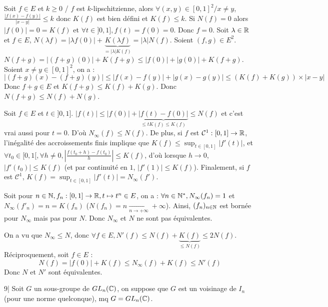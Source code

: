 \begin{solution}
Soit $f \in E$ et $k \geq 0$ / $f$ est $k$-lipschitzienne, alors $\forall (x, y) \in [0, 1]^2 / x \neq y$, $\frac{|f(x) - f(y)|}{|x - y|} \leq k$ donc $K(f)$ est bien défini et $K(f) \leq k$.
Si $N(f) = 0$ alors $|f(0)| = 0 = K(f)$ et $\forall t \in ]0, 1], f(t) = f(0) = 0$. Donc $f = 0$.
Soit $\lambda \in \mathbb R$ et $f \in E$, $N(\lambda f) = |\lambda f(0)| + \underbrace{K(\lambda f)}_{= |\lambda| K(f)} = |\lambda| N(f)$.
Soient $(f, g) \in E^2$.
$N(f + g) = |(f + g)(0)| + K(f + g) \leq |f(0)| + |g(0)| + K(f + g)$.
Soient $x \neq y \in [0, 1]^2$, on a :
\[ |(f + g)(x) - (f + g)(y)| \leq |f(x) - f(y)| + |g(x) - g(y)| \leq (K(f) + K(g)) \times |x - y| \]
Donc $f + g \in E$ et $K(f + g) \leq K(f) + K(g)$. Donc $N(f + g) \leq N(f) + N(g)$.

Soit $f \in E$ et $t \in ]0, 1]$. $|f(t)| \leq |f(0)| + \underbrace{|f(t) - f(0)|}_{\leq t K(f) \leq K(f)} \leq N(f)$ et c'est vrai aussi pour $t = 0$. D'où $N_\infty(f) \leq N(f)$.
De plus, si $f$ est $\mathcal{C}^1 : [0, 1] \to \mathbb R$, l'inégalité des accroissements finis implique que $K(f) \leq \sup_{t \in [0, 1]} |f'(t)|$, et $\forall t_0 \in [0, 1[, \forall h \neq 0, \left|\frac{f(t_0 + h) - f(t_0)}{h}\right| \leq K(f)$, d'où lorsque $h \to 0$, $|f'(t_0)| \leq K(f)$ (et par continuité en $1$, $|f'(1)| \leq K(f)$). Finalement, si $f$ est $\mathcal{C}^1$, $K(f) = \sup_{t \in [0, 1]} |f'(t)| = N_\infty(f')$.

Soit pour $n \in \mathbb N, f_n : [0, 1] \to \mathbb R, t \mapsto t^n \in E$, on a : $\forall n \in \mathbb N^*, N_\infty(f_n) = 1$ et $N_\infty(f'_n) = n = K(f_n)$ ($N(f_n) = n \xrightarrow[n \to +\infty]{} +\infty$).
Ainsi, $(f_n)_{n \in \mathbb N}$ est bornée pour $N_\infty$ mais pas pour $N$. Donc $N_\infty$ et $N$ ne sont pas équivalentes.

On a vu que $N_\infty \leq N$, donc $\forall f \in E, N'(f) \leq N(f) + \underbrace{K(f)}_{\leq N(f)} \leq 2 N(f)$.
Réciproquement, soit $f \in E$ :
\[ N(f) = |f(0)| + K(f) \leq N_\infty(f) + K(f) \leq N'(f) \]
Donc $N$ et $N'$ sont équivalentes.
\end{solution}


\begin{statementbox}
9| Soit $G$ un sous-groupe de $GL_n(\mathbb C)$, on suppose que $G$ est un voisinage de $I_n$ (pour une norme quelconque), mq $G = GL_n(\mathbb C)$.
\end{statementbox}

